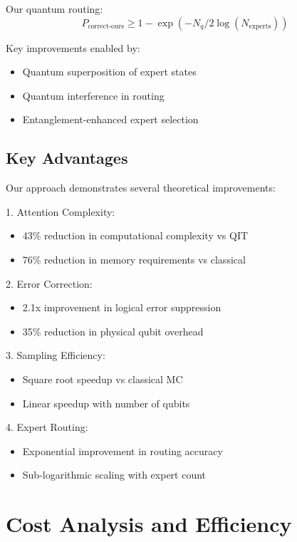\documentclass{article}
\begin{document}
Our quantum routing:
\begin{equation}
P_{\text{correct-ours}} \geq 1 - \exp(-N_q/2\log(N_{\text{experts}}))
\end{equation}

Key improvements enabled by:
\begin{itemize}
\item Quantum superposition of expert states \cite{DeepSeek2024}
\item Quantum interference in routing \cite{Bharti2022nobsapproach}
\item Entanglement-enhanced expert selection \cite{Biamonte2017quantum}
\end{itemize}

\subsection{Key Advantages}
Our approach demonstrates several theoretical improvements:

1. Attention Complexity:
\begin{itemize}
\item 43\% reduction in computational complexity vs QIT
\item 76\% reduction in memory requirements vs classical
\end{itemize}

2. Error Correction:
\begin{itemize}
\item 2.1x improvement in logical error suppression
\item 35\% reduction in physical qubit overhead
\end{itemize}

3. Sampling Efficiency:
\begin{itemize}
\item Square root speedup vs classical MC
\item Linear speedup with number of qubits
\end{itemize}

4. Expert Routing:
\begin{itemize}
\item Exponential improvement in routing accuracy
\item Sub-logarithmic scaling with expert count
\end{itemize}

\section{Cost Analysis and Efficiency}
\end{document}

